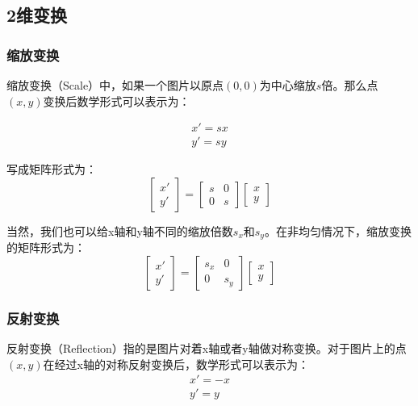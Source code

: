 \documentclass[openany]{progbookcn}
\begin{document}
\subsection{2维变换}

\subsubsection{缩放变换}

缩放变换（Scale）中，如果一个图片以原点$(0,0)$为中心缩放$s$倍。那么点$(x,y)$变换后数学形式可以表示为：

\begin{equation}
\begin{split}
	x'=sx
	\\
	y'=sy
\end{split}
\end{equation}

写成矩阵形式为：
\begin{equation}
	\begin{bmatrix}
		x' \\
		y'
	\end{bmatrix} = \begin{bmatrix}
		s&0\\0&s\end{bmatrix}\begin{bmatrix}x\\y\end{bmatrix}
\end{equation}

当然，我们也可以给x轴和y轴不同的缩放倍数$s_x$和$s_y$。在非均匀情况下，缩放变换的矩阵形式为：
\begin{equation}
	\begin{bmatrix}
		x' \\
		y'
	\end{bmatrix} = \begin{bmatrix}
		s_x&0\\0&s_y\end{bmatrix}\begin{bmatrix}x\\y\end{bmatrix}
\end{equation}

\subsubsection{反射变换}

反射变换（Reflection）指的是图片对着x轴或者y轴做对称变换。对于图片上的点$(x,y)$在经过x轴的对称反射变换后，数学形式可以表示为：
\begin{equation}
	\begin{split}
		x'=-x\\y'=y
	\end{split}
\end{equation}
\end{document}
